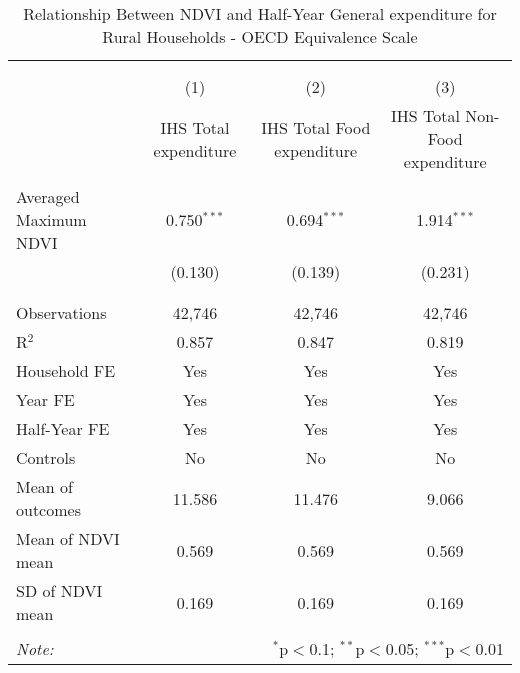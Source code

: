 
\begin{table}[!htbp] \centering 
  \caption{Relationship Between NDVI and Half-Year General expenditure for Rural Households - OECD Equivalence Scale} 
  \label{ndvi_table_3_rural.tex} 
\normalsize 
\begin{tabular}{@{\extracolsep{5pt}}lccc} 
\\[-1.8ex]\hline 
\hline \\[-1.8ex] 
\\[-1.8ex] & (1) & (2) & (3)\\ 
 & IHS Total expenditure & IHS Total Food expenditure & IHS Total Non-Food expenditure \\ 
\hline \\[-1.8ex] 
 Averaged Maximum NDVI & 0.750$^{***}$ & 0.694$^{***}$ & 1.914$^{***}$ \\ 
  & (0.130) & (0.139) & (0.231) \\ 
  & & & \\ 
\hline \\[-1.8ex] 
Observations & 42,746 & 42,746 & 42,746 \\ 
R$^{2}$ & 0.857 & 0.847 & 0.819 \\ 
Household FE & Yes & Yes & Yes \\ 
Year FE & Yes & Yes & Yes \\ 
Half-Year FE & Yes & Yes & Yes \\ 
Controls & No & No & No \\ 
Mean of outcomes & 11.586 & 11.476 & 9.066 \\ 
Mean of NDVI mean & 0.569 & 0.569 & 0.569 \\ 
SD of NDVI mean & 0.169 & 0.169 & 0.169 \\ 
\hline \\[-1.8ex] 
\textit{Note:}  & \multicolumn{3}{r}{$^{*}$p$<$0.1; $^{**}$p$<$0.05; $^{***}$p$<$0.01} \\ 
\end{tabular} 
\end{table} 
